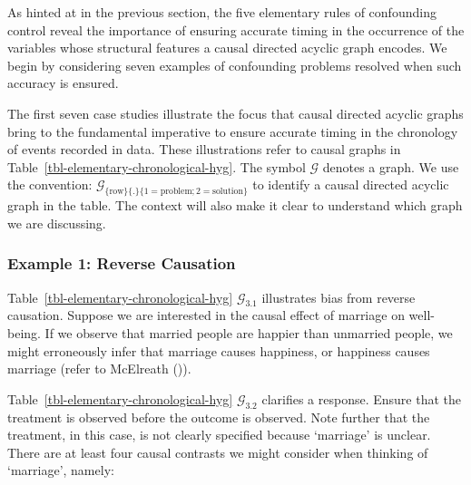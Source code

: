 \documentclass[
  single column]{article}
\begin{document}
\begin{table}

\caption{\label{tbl-elementary-chronological-hyg}}

\centering{

\captionsetup{labelsep=none}

\terminologychronologicalhygeine

}

\end{table}%

As hinted at in the previous section, the five elementary rules of
confounding control reveal the importance of ensuring accurate timing in
the occurrence of the variables whose structural features a causal
directed acyclic graph encodes. We begin by considering seven examples
of confounding problems resolved when such accuracy is ensured.

The first seven case studies illustrate the focus that causal directed
acyclic graphs bring to the fundamental imperative to ensure accurate
timing in the chronology of events recorded in data. These illustrations
refer to causal graphs in Table~\ref{tbl-elementary-chronological-hyg}.
The symbol \(\mathcal{G}\) denotes a graph. We use the convention:
\(\mathcal{G}_{\{\text{row}\}\{.\}\{1 = \text{problem}; 2 = \text{solution}\}}\)
to identify a causal directed acyclic graph in the table. The context
will also make it clear to understand which graph we are discussing.

\subsubsection{Example 1: Reverse
Causation}\label{example-1-reverse-causation}

Table~\ref{tbl-elementary-chronological-hyg} \(\mathcal{G}_{3.1}\)
illustrates bias from reverse causation. Suppose we are interested in
the causal effect of marriage on well-being. If we observe that married
people are happier than unmarried people, we might erroneously infer
that marriage causes happiness, or happiness causes marriage (refer to
McElreath ()).

Table~\ref{tbl-elementary-chronological-hyg} \(\mathcal{G}_{3.2}\)
clarifies a response. Ensure that the treatment is observed before the
outcome is observed. Note further that the treatment, in this case, is
not clearly specified because `marriage' is unclear. There are at least
four causal contrasts we might consider when thinking of `marriage',
namely:
\end{document}
